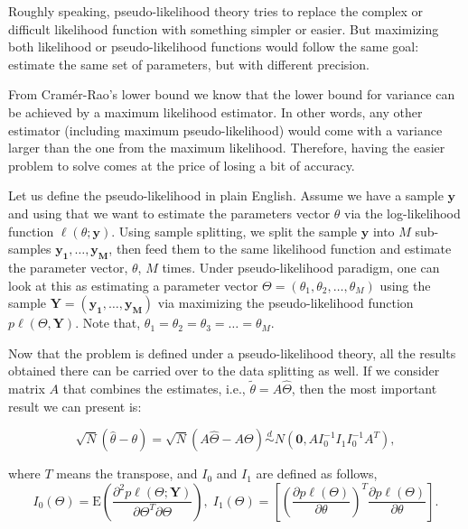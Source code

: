 \documentclass[11pt,a5paper,twoside]{book}
\begin{document}
Roughly speaking, pseudo-likelihood theory tries to replace the complex or difficult likelihood function with something simpler or easier. But maximizing both likelihood or pseudo-likelihood functions would follow the same goal: estimate the same set of parameters, but with different precision.

From Cram\'{e}r-Rao's lower bound \citep{casella2002statistical} we know that the lower bound for variance can be achieved by a maximum likelihood estimator. In other words, any other estimator (including maximum pseudo-likelihood) would come with a variance larger than the one from the maximum likelihood. Therefore, having the easier problem to solve comes at the price of losing a bit of accuracy. 

Let us define the pseudo-likelihood in plain English. Assume we have a sample $\mathbf{y}$ and using that we want to estimate the parameters vector $\theta$ via the log-likelihood function $\ell(\theta; \mathbf{y})$. Using sample splitting, we split the sample $\mathbf{y}$ into $M$ sub-samples $\mathbf{y_1}, \ldots, \mathbf{y_M}$, then feed them to the same likelihood function and estimate the parameter vector, $\theta$, $M$ times. Under pseudo-likelihood paradigm, one can look at this as estimating a parameter vector $\Theta = (\theta_1, \theta_2, \ldots, \theta_M)$ using the sample $\mathbf{Y} = (\mathbf{y_1}, \ldots, \mathbf{y_M})$ via maximizing the pseudo-likelihood function $p\ell(\Theta, \mathbf{Y})$. Note that, $\theta_1 = \theta_2 = \theta_3 = \ldots = \theta_M$. 

Now that the problem is defined under a pseudo-likelihood theory, all the results obtained there can be carried over to the data splitting as well. If we consider matrix $A$ that combines the estimates, i.e., $\widetilde{\theta} = A\widehat{\Theta}$, then the most important result we can present is:

\begin{equation}
\label{eq_clt_pseudolikelihood}
\sqrt{N}(\widehat{\theta} - \theta) = \sqrt{N}(A\widehat{\Theta} - A\Theta) \stackrel{d}{\sim} N\left(\mathbf{0}, A I_0^{-1} I_1 I_0^{-1} A^{T}\right),
\end{equation}

where $T$ means the transpose, and $I_0$ and $I_1$ are defined as follows,
\begin{equation}
\label{eq_hessian_gradient_pl}
I_0(\Theta) = \mathrm{E} \left(\frac{\partial^2 p\ell(\Theta; \mathbf{Y})}{\partial \Theta^T \partial \Theta} \right),\; I_1(\Theta) = \left[\left(\frac{\partial p\ell(\Theta)}{\partial \theta} \right)^T \frac{\partial p\ell(\Theta)}{\partial \theta}  \right].
\end{equation}
\end{document}
